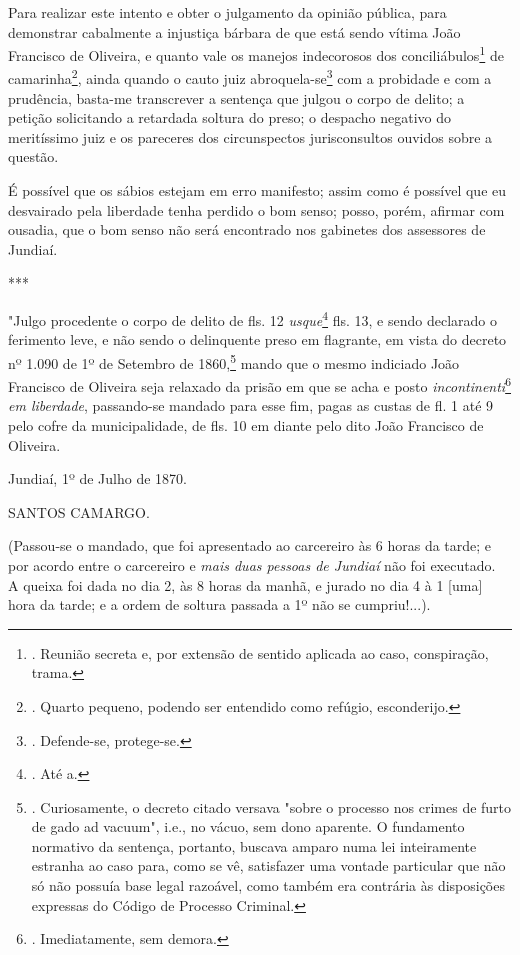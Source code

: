 Para realizar este intento e obter o julgamento da opinião pública, para
demonstrar cabalmente a injustiça bárbara de que está sendo vítima João
Francisco de Oliveira, e quanto vale os manejos indecorosos dos
conciliábulos\footnote{. Reunião secreta e, por extensão de sentido
  aplicada ao caso, conspiração, trama.} de camarinha\footnote{. Quarto
  pequeno, podendo ser entendido como refúgio, esconderijo.}, ainda
quando o cauto juiz abroquela-se\footnote{. Defende-se, protege-se.} com
a probidade e com a prudência, basta-me transcrever a sentença que
julgou o corpo de delito; a petição solicitando a retardada soltura do
preso; o despacho negativo do meritíssimo juiz e os pareceres dos
circunspectos jurisconsultos ouvidos sobre a questão.

É possível que os sábios estejam em erro manifesto; assim como é
possível que eu desvairado pela liberdade tenha perdido o bom senso;
posso, porém, afirmar com ousadia, que o bom senso não será encontrado
nos gabinetes dos assessores de Jundiaí.

***

"Julgo procedente o corpo de delito de fls. 12 \emph{usque}\footnote{.
  Até a.} fls. 13, e sendo declarado o ferimento leve, e não sendo o
delinquente preso em flagrante, em vista do decreto nº 1.090 de 1º de
Setembro de 1860,\footnote{. Curiosamente, o decreto citado versava
  "sobre o processo nos crimes de furto de gado ad vacuum", i.e., no
  vácuo, sem dono aparente. O fundamento normativo da sentença,
  portanto, buscava amparo numa lei inteiramente estranha ao caso para,
  como se vê, satisfazer uma vontade particular que não só não possuía
  base legal razoável, como também era contrária às disposições
  expressas do Código de Processo Criminal.} mando que o mesmo indiciado
João Francisco de Oliveira seja relaxado da prisão em que se acha e
posto \emph{incontinenti}\footnote{. Imediatamente, sem demora.}
\emph{em liberdade}, passando-se mandado para esse fim, pagas as custas
de fl. 1 até 9 pelo cofre da municipalidade, de fls. 10 em diante pelo
dito João Francisco de Oliveira.

Jundiaí, 1º de Julho de 1870.

SANTOS CAMARGO.

(Passou-se o mandado, que foi apresentado ao carcereiro às 6 horas da
tarde; e por acordo entre o carcereiro e \emph{mais duas pessoas de
Jundiaí} não foi executado.\\
A queixa foi dada no dia 2, às 8 horas da manhã, e jurado no dia 4 à 1
{[}uma{]} hora da tarde; e a ordem de soltura passada a 1º não se
cumpriu!...).

